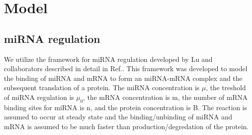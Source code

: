 \documentclass{article}
\begin{document}
\section{Model}

%
%
%

\subsection{miRNA regulation}
We utilize the framework for miRNA regulation developed by Lu and collaborators described in detail in Ref.\cite{Lu2013}.
This framework was developed to model the binding of miRNA and mRNA to form an miRNA-mRNA complex and the subsequent translation of a protein. 
The miRNA concentration is $\mu$, the treshold of miRNA regulation is $\mu_0$, the mRNA concentration is m, the number of mRNA binding sites for miRNA is n, and the protein concentration is B.
The reaction is assumed to occur at steady state and the binding/unbinding of miRNA and mRNA is assumed to be much faster than production/degredation of the protein.
\end{document}
